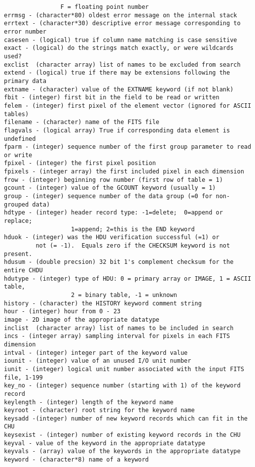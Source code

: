 \documentclass[11pt]{book}
\begin{document}
\begin{verbatim}
                F = floating point number
errmsg - (character*80) oldest error message on the internal stack
errtext - (character*30) descriptive error message corresponding to error number
casesen - (logical) true if column name matching is case sensitive
exact - (logical) do the strings match exactly, or were wildcards used?
exclist  (character array) list of names to be excluded from search
extend - (logical) true if there may be extensions following the primary data
extname - (character) value of the EXTNAME keyword (if not blank)
fbit - (integer) first bit in the field to be read or written
felem - (integer) first pixel of the element vector (ignored for ASCII tables)
filename - (character) name of the FITS file
flagvals - (logical array) True if corresponding data element is undefined
fparm - (integer) sequence number of the first group parameter to read or write
fpixel - (integer) the first pixel position
fpixels - (integer array) the first included pixel in each dimension
frow - (integer) beginning row number (first row of table = 1)
gcount - (integer) value of the GCOUNT keyword (usually = 1)
group - (integer) sequence number of the data group (=0 for non-grouped data)
hdtype - (integer) header record type: -1=delete;  0=append or replace;
                   1=append; 2=this is the END keyword
hduok - (integer) was the HDU verification successful (=1) or
         not (= -1).  Equals zero if the CHECKSUM keyword is not present.
hdusum - (double precsion) 32 bit 1's complement checksum for the entire CHDU
hdutype - (integer) type of HDU: 0 = primary array or IMAGE, 1 = ASCII table,
                   2 = binary table, -1 = unknown
history - (character) the HISTORY keyword comment string
hour - (integer) hour from 0 - 23
image - 2D image of the appropriate datatype
inclist  (character array) list of names to be included in search
incs - (integer array) sampling interval for pixels in each FITS dimension
intval - (integer) integer part of the keyword value
iounit - (integer) value of an unused I/O unit number
iunit - (integer) logical unit number associated with the input FITS file, 1-199
key_no - (integer) sequence number (starting with 1) of the keyword record
keylength - (integer) length of the keyword name
keyroot - (character) root string for the keyword name
keysadd -(integer) number of new keyword records which can fit in the CHU
keysexist - (integer) number of existing keyword records in the CHU
keyval - value of the keyword in the appropriate datatype
keyvals - (array) value of the keywords in the appropriate datatype
keyword - (character*8) name of a keyword

\end{verbatim}
\end{document}
